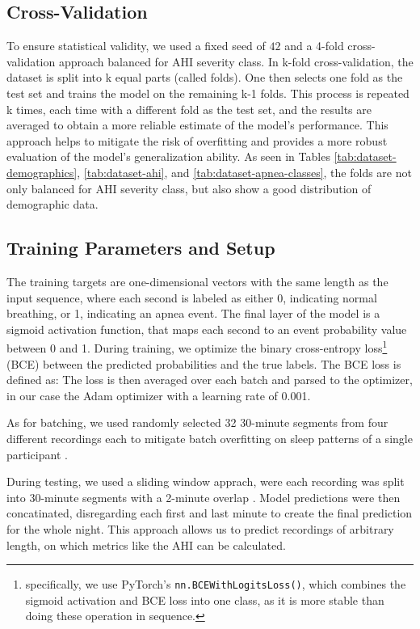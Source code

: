\subsection*{Cross-Validation}

To ensure statistical validity, we used a fixed seed of $42$ and a 4-fold cross-validation approach balanced for AHI severity class. In k-fold cross-validation, the dataset is split into k equal parts (called folds). One then selects one fold as the test set and trains the model on the remaining k-1 folds. This process is repeated k times, each time with a different fold as the test set, and the results are averaged to obtain a more reliable estimate of the model's performance. This approach helps to mitigate the risk of overfitting and provides a more robust evaluation of the model's generalization ability.
As seen in Tables \ref{tab:dataset-demographics}, \ref{tab:dataset-ahi}, and \ref{tab:dataset-apnea-classes}, the folds are not only balanced for AHI severity class, but also show a good distribution of demographic data.

\subsection*{Training Parameters and Setup}

The training targets are one-dimensional vectors with the same length as the input sequence, where each second is labeled as either 0, indicating normal breathing, or 1, indicating an apnea event. The final layer of the model is a sigmoid activation function, that maps each second to an event probability value between 0 and 1. During training, we optimize the binary cross-entropy loss\footnote{specifically, we use PyTorch's  \texttt{nn.BCEWithLogitsLoss()}, which combines the sigmoid activation and BCE loss into one class, as it is more stable than doing these operation in sequence.} (BCE) between the predicted probabilities and the true labels. The BCE loss is defined as:
The loss is then averaged over each batch and parsed to the optimizer, in our case the Adam optimizer with a learning rate of 0.001.

As for batching, we used randomly selected 32 30-minute segments from four different recordings each to mitigate batch overfitting on sleep patterns of a single participant .

During testing, we used a sliding window apprach, were each recording was split into 30-minute segments with a 2-minute overlap . Model predictions were then concatinated, disregarding each first and last minute to create the final prediction for the whole night. This approach allows us to predict recordings of arbitrary length, on which metrics like the AHI can be calculated.

